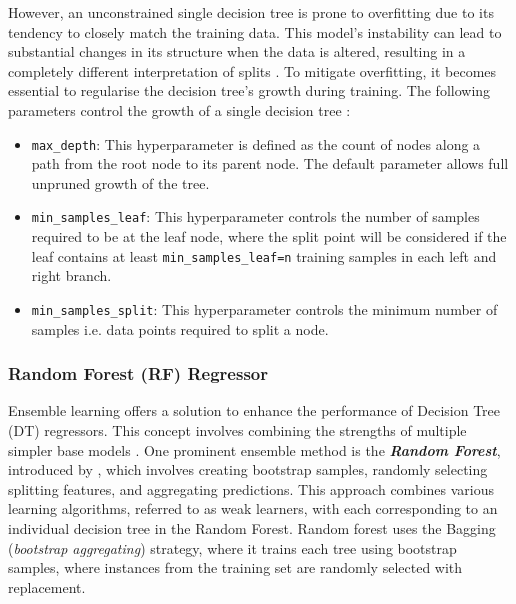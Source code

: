 \documentclass[]{interact}
\theoremstyle{plain}%
\theoremstyle{definition}
\theoremstyle{remark}
\begin{document}
However, an unconstrained single decision tree is prone to overfitting due to its tendency to closely match the training data. This model's instability can lead to substantial changes in its structure when the data is altered, resulting in a completely different interpretation of splits \citep{Hastie.2009, Kuhn.2013}. To mitigate overfitting, it becomes essential to regularise the decision tree's growth during training. The following parameters control the growth of a single decision tree : 

\begin{itemize}
  \item \texttt{max\_depth}: This hyperparameter is defined as the count of nodes along a path from the root node to its parent node. The default parameter allows full unpruned growth of the tree.
  \item \texttt{min\_samples\_leaf}: This hyperparameter controls the number of samples required to be at the leaf node, where the split point will be considered if the leaf contains at least {\tt min\_samples\_leaf=n} training samples in each left and right branch.
  \item \texttt{min\_samples\_split}: This hyperparameter controls the minimum number of samples i.e. data points required to split a node.    
\end{itemize}

\subsubsection{Random Forest (RF) Regressor}\label{sec:rf_theo_j}

Ensemble learning offers a solution to enhance the performance of Decision Tree (DT) regressors. This concept involves combining the strengths of multiple simpler base models \citep{Hastie.2009}. One prominent ensemble method is the \textbf{\emph{Random Forest}}, introduced by \citet{Breiman.2001}, which involves creating bootstrap samples, randomly selecting splitting features, and aggregating predictions. This approach combines various learning algorithms, referred to as weak learners, with each corresponding to an individual decision tree in the Random Forest. Random forest uses the Bagging (\emph{bootstrap aggregating}) strategy, where it trains each tree using bootstrap samples, where instances from the training set are randomly selected with replacement.\\ 
\end{document}
